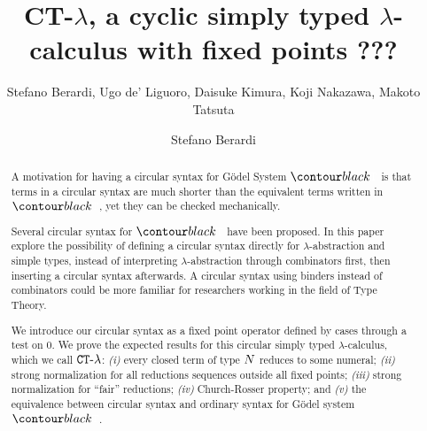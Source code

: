 \ifdraft

\title{CT-$\lambda$, a cyclic simply typed $\lambda$-calculus with fixed points}

\author{Stefano Berardi,  Ugo de' Liguoro, Daisuke Kimura, Koji Nakazawa, Makoto Tatsuta}
\date{}

\else

\title[Equivalence]
{
???
}

\author[S. Berardi]{Stefano Berardi}
\address{Universit\`{a} di Torino,
Torino, Italy}


\fi

\maketitle

\begin{abstract}
A motivation for having a circular syntax for G\"{o}del System $\systemT$ is that terms 
in a circular syntax are much shorter than the equivalent terms written in $\systemT$, 
yet they can be checked mechanically.

Several circular syntax for $\systemT$ have been proposed.
In this paper explore the possibility of defining a circular syntax
directly for $\lambda$-abstraction and simple types, instead of interpreting
 $\lambda$-abstraction through combinators first, then inserting a  circular syntax afterwards.
A circular syntax using binders instead of combinators
could be more familiar for researchers working in the field of Type Theory.

We introduce our circular syntax as a fixed point operator defined by cases through a test on $0$.
We prove the expected results for this circular simply typed $\lambda$-calculus, which we call ${ {\tt CT} \mbox{-} \lambda}$: 
\emph{(i)} every closed term of type ${N}$ reduces to some numeral;
\emph{(ii)}  strong normalization for all reductions sequences outside all fixed points; 
\emph{(iii)}  strong normalization for ``fair'' reductions; \emph{(iv)} Church-Rosser property;
and \emph{(v)} the equivalence between circular syntax and ordinary syntax 
for G\"{o}del system $\systemT$. 


\end{abstract}

\iffalse
key words: 
proof theory,
inductive definitions,
Brotherston-Simpson conjecture,
cyclic proofs,
Martin-Lof's system of inductive definitions,
infinite Ramsey theorem
Podelski-Rybalchenko termination theorem
size-change termination theorem
\fi
